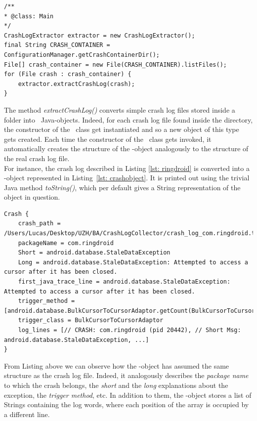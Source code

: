 \begin{lstlisting}[caption=\Extractor\ code snippet converting crash files into CrashLog objects,label={lst: extractor}]
/**
* @class: Main
*/
CrashLogExtractor extractor = new CrashLogExtractor();
final String CRASH_CONTAINER = ConfigurationManager.getCrashContainerDir();
File[] crash_container = new File(CRASH_CONTAINER).listFiles();
for (File crash : crash_container) {
	extractor.extractCrashLog(crash);
}
\end{lstlisting} 
The method \textit{extractCrashLog()} converts simple crash log files stored inside a folder into \Crash\ Java-objects. 
Indeed, for each crash log file found inside the directory, the constructor of the \Crash\ class get instantiated and so a new object of this type gets created. Each time the constructor of the \Crash\ class gets invoked, it automatically creates the structure of the \Crash-object analogously to the structure of the real crash log file. \\
For instance, the crash log described in Listing \ref{lst: ringdroid} is converted into a \Crash-object represented in Listing~\ref{lst: crashobject}.
It is printed out using the trivial Java method \textit{toString()}, which  per default gives a String representation of the object in question.  

\begin{lstlisting}[caption=\Crash-object,basicstyle=\fontsize{6}{8}\ttfamily, label={lst: crashobject}]
Crash {
	crash_path = /Users/Lucas/Desktop/UZH/BA/CrashLogCollector/crash_log_com.ringdroid.txt
	packageName = com.ringdroid
	Short = android.database.StaleDataException
	Long = android.database.StaleDataException: Attempted to access a cursor after it has been closed.
	first_java_trace_line = android.database.StaleDataException: Attempted to access a cursor after it has been closed.
	trigger_method = [android.database.BulkCursorToCursorAdaptor.getCount(BulkCursorToCursorAdaptor.java:70)]
	trigger_class = BulkCursorToCursorAdaptor
	log_lines = [// CRASH: com.ringdroid (pid 20442), // Short Msg: android.database.StaleDataException, ...]
}
\end{lstlisting}
From Listing above we can observe how the \Crash-object has assumed the same structure as the crash log file. Indeed, it analogously describes the \textit{package name} to which the crash belongs, the \textit{short} and the \textit{long} explanations about the exception, the \textit{trigger method}, etc.
In addition to them, the \Crash-object stores a list of Strings containing the log words, where each position of the array is occupied by a different line. 
